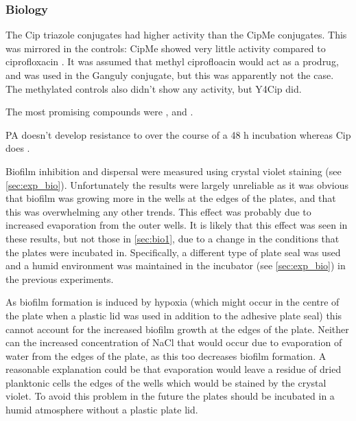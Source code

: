 \subsubsection{Biology}



The Cip triazole conjugates had higher activity than the CipMe conjugates. This was mirrored in the controls: CipMe showed very little activity compared to ciprofloxacin . It was assumed that methyl ciprofloacin would act as a prodrug, and was used in the Ganguly conjugate, but this was apparently not the case. The methylated controls also didn't show any activity, but Y4Cip did.


The most promising compounds were ,  and .

PA doesn't develop resistance to  over the course of a 48 h incubation whereas Cip does \cite{Su2010}.


Biofilm inhibition and dispersal were measured using crystal violet staining  (see \ref{sec:exp_bio}). Unfortunately the results were largely unreliable as it was obvious that biofilm was growing more in the wells at the edges of the plates, and that this was overwhelming any other trends. This effect was probably due to increased evaporation from the outer wells. 
It is likely that this effect was seen in these results, but not those in \ref{sec:bio1}, due to a change in the conditions that the plates were incubated in. Specifically, a different type of plate seal was used and a humid environment was maintained in the incubator (see \ref{sec:exp_bio}) in the previous experiments.

As biofilm formation is induced by hypoxia\cite{Ghotaslou2013} (which might occur in the centre of the plate when a plastic lid was used in addition to the adhesive plate seal) this cannot account for the increased biofilm growth at the edges of the plate. Neither can the increased concentration of NaCl that would occur due to evaporation of water from the edges of the plate, as this too decreases biofilm formation\cite{Bazire2007}. 
A reasonable explanation could be that evaporation would leave a residue of dried planktonic cells the edges of the wells which would be stained by the crystal violet.
To avoid this problem in the future the plates should be incubated in a humid atmosphere without a plastic plate lid.
